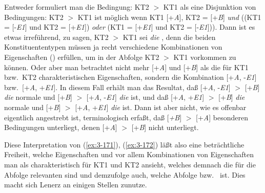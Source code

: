 \documentclass[output=paper]{langsci/langscibook}
\begin{document}
Entweder formuliert man die Bedingung: KT2 $>$ KT1 als eine Disjunktion
von Bedingungen: KT2 $>$ KT1 ist möglich wenn KT1 [+\textit{A}], KT2 = [+\textit{B}] \textit{und}
((KT1 = [-\textit{E1}] und KT2 = [+\textit{E1}]) \textit{oder} (KT1 = [+\textit{E1}] und KT2 =
[-\textit{E1}])). Dann ist es etwas irreführend, zu sagen, KT2 $>$ KT1 sei \textit{die}
, denn die beiden Konstituententypen müssen ja recht
verschiedene Kombinationen von Eigenschaften ()
erfüllen, um in der Abfolge KT2 $>$ KT1 vorkommen zu können. Oder aber
man betrachtet nicht mehr [+\textit{A}] und [+\textit{B}] als die für KT1 bzw.\ KT2
charakteristischen Eigenschaften, sondern \zb die Kombination [+\textit{A}, -\textit{E1}] bzw.\ [+\textit{A}, +\textit{E1}]. In diesem Fall erhält man das Resultat, daß [+\textit{A}, -\textit{E1}] $>$ [+\textit{B}] \textit{die} normale und [+\textit{B}] $>$ [+\textit{A}, -\textit{E1}] \textit{die}  ist, und daß [+\textit{A}, +\textit{E1}] $>$ [+\textit{B}] \textit{die} normale und [+\textit{B}] $>$ [+\textit{A}, +\textit{E1}] \textit{die}  ist. Dann ist aber nicht, wie es offenbar eigentlich
angestrebt ist, terminologisch erfaßt, daß [\textit{+B}] $>$ [+\textit{A}] besonderen
Bedingungen unterliegt, denen [+\textit{A}] $>$ [+\textit{B}] nicht unterliegt.

Diese Interpretation von (\ref{ex:3-171}), (\ref{ex:3-172}) läßt also eine beträchtliche
Freiheit, welche Eigenschaften und vor allem Kombinationen von
Eigenschaften man als charakteristisch für KT1 und KT2 ansieht,
welches demnach die für die Abfolge relevanten 
sind und demzufolge auch, welche Abfolge 
bzw.\  ist. Dies macht sich Lenerz an einigen Stellen
zunutze.
\end{document}
